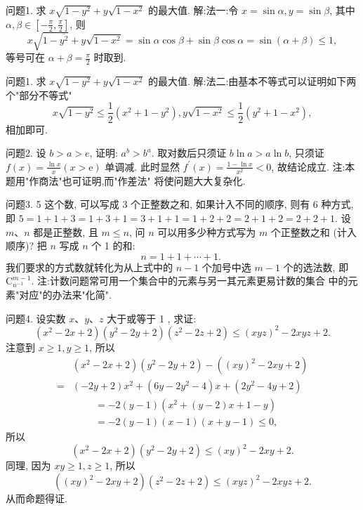 
问题1. 求 $x \sqrt{1-y^2}+y \sqrt{1-x^2}$ 的最大值.
解:法一:令 $x=\sin \alpha, y=\sin \beta$, 其中 $\alpha, \beta \in\left[-\frac{\pi}{2}, \frac{\pi}{2}\right]$, 则
$$
x \sqrt{1-\overline{y^2}}+y \sqrt{1-x^2}=\sin \alpha \cos \beta+\sin \beta \cos \alpha=\sin (\alpha+\beta) \leqslant 1,
$$
等号可在 $\alpha+\beta=\frac{\pi}{2}$ 时取到.



问题1. 求 $x \sqrt{1-y^2}+y \sqrt{1-x^2}$ 的最大值.
解:法二:由基本不等式可以证明如下两个"部分不等式"
$$
x \sqrt{1-y^2} \leqslant \frac{1}{2}\left(x^2+1-y^2\right), y \sqrt{1-x^2} \leqslant \frac{1}{2}\left(y^2+1-x^2\right),
$$
相加即可.



问题2. 设 $b>a>e$, 证明: $a^b>b^a$.
取对数后只须证 $b \ln a>a \ln b$, 只须证 $f(x)=\frac{\ln x}{x}(x>\mathrm{e})$ 单调减.
此时显然 $f^{\prime}(x)=\frac{1-\ln x}{x^2}<0$, 故结论成立.
注:本题用"作商法"也可证明,而"作差法" 将使问题大大复杂化.



问题3. 5 这个数, 可以写成 3 个正整数之和, 如果计入不同的顺序, 则有 6 种方式, 即
$5=1+1+3=1+3+1=3+1+1=1+2+2=2+1+2=2+2+1$.
设 $m 、 n$ 都是正整数, 且 $m \leqslant n$, 问 $n$ 可以用多少种方式写为 $m$ 个正整数之和 (计入顺序)?
把 $n$ 写成 $n$ 个 1 的和:
$$
n=1+1+\cdots+1 \text {. }
$$
我们要求的方式数就转化为从上式中的 $n-1$ 个加号中选 $m-1$ 个的选法数, 即 $\mathrm{C}_{n^{-1}}^{m-1}$.
注:计数问题常可用一个集合中的元素与另一其元素更易计数的集合 中的元素"对应"的办法来"化简".



问题4. 设实数 $x 、 y 、 z$ 大于或等于 1 , 求证:
$$
\left(x^2-2 x+2\right)\left(y^2-2 y+2\right)\left(z^2-2 z+2\right) \leqslant(x y z)^2-2 x y z+2 .
$$
注意到 $x \geqslant 1, y \geqslant 1$, 所以
$$
\begin{aligned}
& \left(x^2-2 x+2\right)\left(y^2-2 y+2\right)-\left((x y)^2-2 x y+2\right) \\
= & (-2 y+2) x^2+\left(6 y-2 y^2-4\right) x+\left(2 y^2-4 y+2\right)
\end{aligned}
$$
$$
\begin{aligned}
& =-2(y-1)\left(x^2+(y-2) x+1-y\right) \\
& =-2(y-1)(x-1)(x+y-1) \leqslant 0,
\end{aligned}
$$
所以
$$
\left(x^2-2 x+2\right)\left(y^2-2 y+2\right) \leqslant(x y)^2-2 x y+2 .
$$
同理, 因为 $x y \geqslant 1, z \geqslant 1$, 所以
$$
\left((x y)^2-2 x y+2\right)\left(z^2-2 z+2\right) \leqslant(x y z)^2-2 x y z+2 .
$$
从而命题得证.



